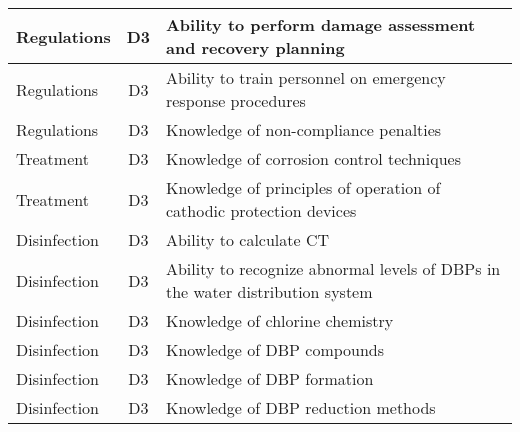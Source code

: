 \documentclass{article}
\begin{document}
\begin{table}[]
\begin{tabular}{|l|c|l|}
Regulations                            & D3             & Ability to perform   damage assessment and recovery planning                                                                      \\ \hline
Regulations                            & D3             & Ability to train   personnel on emergency response procedures                                                                     \\ \hline
Regulations                            & D3             & Knowledge of   non-compliance penalties                                                                                           \\ \hline
Treatment                              & D3             & Knowledge of   corrosion control techniques                                                                                       \\ \hline
Treatment                              & D3             & Knowledge of   principles of operation of cathodic protection devices                                                             \\ \hline
Disinfection                           & D3             & Ability to calculate   CT                                                                                                         \\ \hline
Disinfection                           & D3             & Ability to recognize   abnormal levels of DBPs in the water distribution system                                                   \\ \hline
Disinfection                           & D3             & Knowledge of chlorine   chemistry                                                                                                 \\ \hline
Disinfection                           & D3             & Knowledge of DBP   compounds                                                                                                      \\ \hline
Disinfection                           & D3             & Knowledge of DBP   formation                                                                                                      \\ \hline
Disinfection                           & D3             & Knowledge of DBP   reduction methods                                                                                              \\ \hline

\end{tabular}
\end{table}
\end{document}
